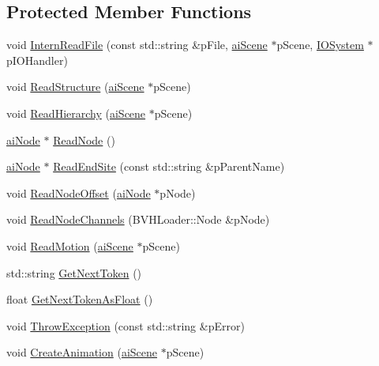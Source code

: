 \subsection*{Protected Member Functions}
\begin{DoxyCompactItemize}
\item 
void \hyperlink{class_assimp_1_1_b_v_h_loader_ab523acec0ea7c03e18c75d3ace26d81d}{Intern\+Read\+File} (const std\+::string \&p\+File, \hyperlink{structai_scene}{ai\+Scene} $\ast$p\+Scene, \hyperlink{class_assimp_1_1_i_o_system}{I\+O\+System} $\ast$p\+I\+O\+Handler)
\item 
void \hyperlink{class_assimp_1_1_b_v_h_loader_aa443c67abf02c833179cf3f9c6875955}{Read\+Structure} (\hyperlink{structai_scene}{ai\+Scene} $\ast$p\+Scene)
\item 
void \hyperlink{class_assimp_1_1_b_v_h_loader_a69494036c87c1f5aeae005174c57a814}{Read\+Hierarchy} (\hyperlink{structai_scene}{ai\+Scene} $\ast$p\+Scene)
\item 
\hyperlink{structai_node}{ai\+Node} $\ast$ \hyperlink{class_assimp_1_1_b_v_h_loader_a86beb3477762adc5af1bcbbc64bfbc3c}{Read\+Node} ()
\item 
\hyperlink{structai_node}{ai\+Node} $\ast$ \hyperlink{class_assimp_1_1_b_v_h_loader_a2abb9c53632af31e831ad9430066910d}{Read\+End\+Site} (const std\+::string \&p\+Parent\+Name)
\item 
void \hyperlink{class_assimp_1_1_b_v_h_loader_a1c2fca185d21db97ff66b0a8f0bab4e5}{Read\+Node\+Offset} (\hyperlink{structai_node}{ai\+Node} $\ast$p\+Node)
\item 
void \hyperlink{class_assimp_1_1_b_v_h_loader_acd324c85bb663f1e994ca1ea3dcccea3}{Read\+Node\+Channels} (B\+V\+H\+Loader\+::\+Node \&p\+Node)
\item 
void \hyperlink{class_assimp_1_1_b_v_h_loader_a0ef5d1bf53a2fc94100704130a136be1}{Read\+Motion} (\hyperlink{structai_scene}{ai\+Scene} $\ast$p\+Scene)
\item 
std\+::string \hyperlink{class_assimp_1_1_b_v_h_loader_ad21f9cc1c49716a15b8f2e737d8b7f4d}{Get\+Next\+Token} ()
\item 
float \hyperlink{class_assimp_1_1_b_v_h_loader_a237c0c68ab72888ea97c5da81ef09ef2}{Get\+Next\+Token\+As\+Float} ()
\item 
void \hyperlink{class_assimp_1_1_b_v_h_loader_ae5ac33695be2a1e357e018d4b6d26950}{Throw\+Exception} (const std\+::string \&p\+Error)
\item 
void \hyperlink{class_assimp_1_1_b_v_h_loader_ac43bac20ea8cc50b73b0a8f9f0c02055}{Create\+Animation} (\hyperlink{structai_scene}{ai\+Scene} $\ast$p\+Scene)
\end{DoxyCompactItemize}
